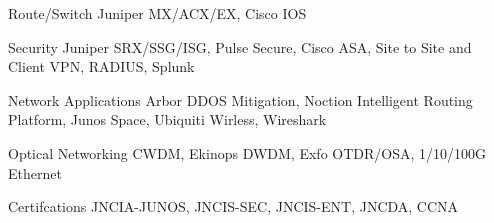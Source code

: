 


\begin{cvskills}


\cvskill
{Route/Switch}
{Juniper MX/ACX/EX, Cisco IOS}


\cvskill
{Security}
{Juniper SRX/SSG/ISG, Pulse Secure, Cisco ASA, Site to Site and Client VPN, RADIUS, Splunk}


\cvskill
{Network Applications}
{Arbor DDOS Mitigation, Noction Intelligent Routing Platform, Junos Space, Ubiquiti Wirless, Wireshark}


\cvskill
{Optical Networking}
{CWDM, Ekinops DWDM, Exfo OTDR/OSA, 1/10/100G Ethernet}


\cvskill
{Certifcations}
{JNCIA-JUNOS, JNCIS-SEC, JNCIS-ENT, JNCDA, CCNA}

\end{cvskills}
